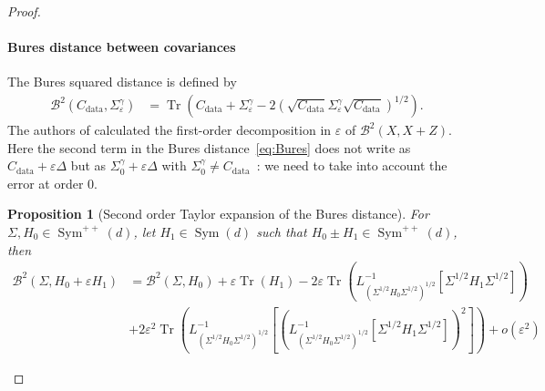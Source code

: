 \documentclass[11pt]{article}
\newtheorem{prop}{Proposition}
\newcommand{\tr}[1]{\operatorname{Tr}\left({#1}\right)}
\begin{document}
\begin{proof}
\paragraph{Bures distance between covariances}
The Bures squared distance is defined by
\begin{align} \label{eq:Bures}
\mathcal{B}^2(C_\mathrm{data}, \Sigma^\gamma_\varepsilon) &= \tr{ C_\mathrm{data} + \Sigma^\gamma_\varepsilon - 2 (\sqrt{C_\mathrm{data}} \Sigma^\gamma_\varepsilon \sqrt{C_\mathrm{data}})^{1/2} } .
\end{align}
The authors of \cite{malago2018wasserstein} calculated the first-order decomposition in $\varepsilon$ of $\mathcal{B}^2(X, X + Z)$. Here the second term in the Bures distance~\eqref{eq:Bures} does not write as $C_\mathrm{data} + \varepsilon \Delta$ but as $ \Sigma^\gamma_0 + \varepsilon \Delta$ with $\Sigma^\gamma_0 \neq C_\mathrm{data}$~: we need to take into account the error at order $0$. 
\begin{prop}[Second order Taylor expansion of the Bures distance] \label{prop:Langevin_2}
For $\Sigma, H_0 \in \operatorname{Sym}^{++}(d)$, let $H_1 \in \operatorname{Sym}(d)$ such that ${H_0 \pm H_1 \in  \operatorname{Sym}^{++}(d)}$, then 
\begin{align*}
\mathcal{B}^2(\Sigma, H_0 + \varepsilon H_1) &= \mathcal{B}^2(\Sigma, H_0) +\varepsilon\tr{H_1} - 2\varepsilon \tr{L_{\left({\Sigma}^{1/2}H_0{\Sigma}^{1/2} \right)^{1/2}}^{-1}\left[{\Sigma}^{1/2} H_1 {\Sigma}^{1/2}\right]} \\ &+ 2\varepsilon^2\tr{L_{\left({\Sigma}^{1/2}H_0{\Sigma}^{1/2} \right)^{1/2}}^{-1}\left[\left(L_{\left({\Sigma}^{1/2}H_0{\Sigma}^{1/2} \right)^{1/2}}^{-1}\left[{\Sigma}^{1/2} H_1 {\Sigma}^{1/2}\right]\right)^2\right] } +o(\varepsilon^2) \nonumber
\end{align*} 
\end{prop}


\end{proof}
\end{document}
